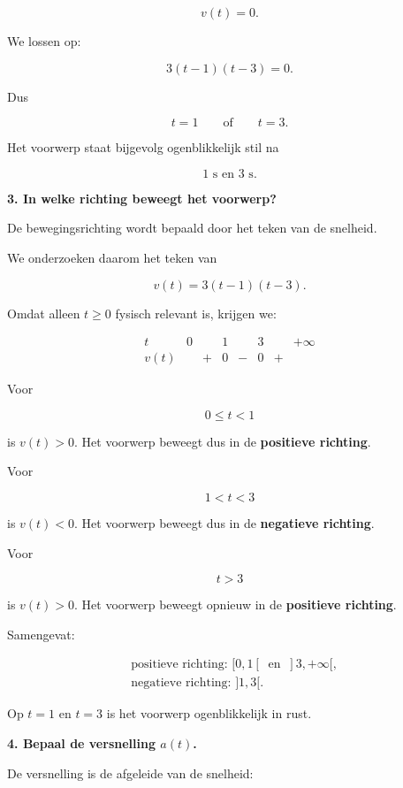 \documentclass{ximera}
\begin{document}
\begin{oefening}{\oefU\ESS}
\begin{oplossing}
  \[
  v(t)=0.
  \]
  
  We lossen op:
  
  \[
  3(t-1)(t-3)=0.
  \]
  
  Dus
  
  \[
  t=1
  \qquad\text{of}\qquad
  t=3.
  \]
  
  Het voorwerp staat bijgevolg ogenblikkelijk stil na
  
  \[
  \boxed{1\text{ s en }3\text{ s}.}
  \]
  
  \textbf{3. In welke richting beweegt het voorwerp?}
  
  De bewegingsrichting wordt bepaald door het teken van de snelheid.
  
  We onderzoeken daarom het teken van
  
  \[
  v(t)=3(t-1)(t-3).
  \]
  
  Omdat alleen $t\geq0$ fysisch relevant is, krijgen we:
  
  \[
  \begin{array}{c|ccccccc}
  t
  & 0 & & 1 & & 3 & & +\infty
  \\ \hline
  v(t)
  & & + & 0 & - & 0 & + &
  \end{array}
  \]
  
  Voor
  
  \[
  0\leq t<1
  \]
  
  is $v(t)>0$. Het voorwerp beweegt dus in de
  \textbf{positieve richting}.
  
  Voor
  
  \[
  1<t<3
  \]
  
  is $v(t)<0$. Het voorwerp beweegt dus in de
  \textbf{negatieve richting}.
  
  Voor
  
  \[
  t>3
  \]
  
  is $v(t)>0$. Het voorwerp beweegt opnieuw in de
  \textbf{positieve richting}.
  
  Samengevat:
  
  \[
  \boxed{
  \begin{aligned}
  &\text{positieve richting: }[0,1[\ \text{ en }\ ]3,+\infty[,\\
  &\text{negatieve richting: }]1,3[.
  \end{aligned}
  }
  \]
  
  Op $t=1$ en $t=3$ is het voorwerp ogenblikkelijk in rust.
  
  \textbf{4. Bepaal de versnelling $a(t)$.}
  
  De versnelling is de afgeleide van de snelheid:
  

\end{oplossing}
\end{oefening}
\end{document}

